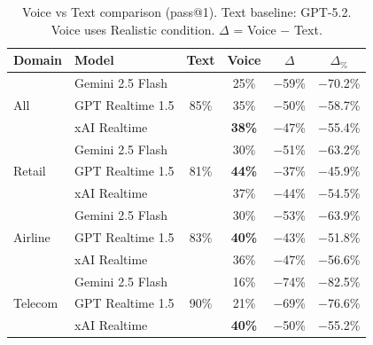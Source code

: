 \begin{table}[h]
\caption{Voice vs Text comparison (pass@1). Text baseline: GPT-5.2. Voice uses Realistic condition. $\Delta$ = Voice $-$ Text.}
\label{tab:voice-vs-text}
\centering
\begin{small}
\begin{tabular}{@{}llcccc@{}}
\toprule
\textbf{Domain} & \textbf{Model} & \textbf{Text} & \textbf{Voice} & \textbf{$\Delta$} & \textbf{$\Delta_{\%}$} \\
\midrule
\multirow{3}{*}{All} & Gemini 2.5 Flash & \multirow{3}{*}{85\%} & 25\% & $-$59\% & $-$70.2\% \\
 & GPT Realtime 1.5 &  & 35\% & $-$50\% & $-$58.7\% \\
 & xAI Realtime &  & \textbf{38\%} & $-$47\% & $-$55.4\% \\
\midrule
\multirow{3}{*}{Retail} & Gemini 2.5 Flash & \multirow{3}{*}{81\%} & 30\% & $-$51\% & $-$63.2\% \\
 & GPT Realtime 1.5 &  & \textbf{44\%} & $-$37\% & $-$45.9\% \\
 & xAI Realtime &  & 37\% & $-$44\% & $-$54.5\% \\
\midrule
\multirow{3}{*}{Airline} & Gemini 2.5 Flash & \multirow{3}{*}{83\%} & 30\% & $-$53\% & $-$63.9\% \\
 & GPT Realtime 1.5 &  & \textbf{40\%} & $-$43\% & $-$51.8\% \\
 & xAI Realtime &  & 36\% & $-$47\% & $-$56.6\% \\
\midrule
\multirow{3}{*}{Telecom} & Gemini 2.5 Flash & \multirow{3}{*}{90\%} & 16\% & $-$74\% & $-$82.5\% \\
 & GPT Realtime 1.5 &  & 21\% & $-$69\% & $-$76.6\% \\
 & xAI Realtime &  & \textbf{40\%} & $-$50\% & $-$55.2\% \\
\bottomrule
\end{tabular}
\end{small}
\end{table}